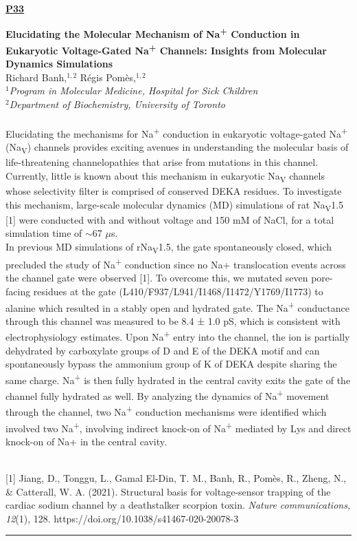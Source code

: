 \documentclass[titlepage,oneside,openany,10pt]{book}
\newenvironment{posterabswref}[5] %
        {
        \newcommand{\posterref}{#5}
	\begin{flushright}
                \underline{\textbf{#4}}
        \end{flushright}
        \textbf{#1}\\%
        #2\\%
        \textit{#3}\\\\%
        }
        {
        \vspace{0.5cm}
        \\\noindent \posterref \\ \noindent\rule{15cm}{0.5pt}%
        }
\begin{document}

\newpage

\begin{posterabswref}
    {Elucidating the Molecular Mechanism of Na\textsuperscript{+} Conduction in Eukaryotic Voltage-Gated Na\textsuperscript{+} Channels: Insights from Molecular Dynamics Simulations}
    {Richard Banh,$^{1,2}$ R\'{e}gis Pom\`{e}s,$^{1,2}$}
    {
    $^1$Program in Molecular Medicine, Hospital for Sick Children\\
    $^2$Department of Biochemistry, University of Toronto
    }
    {P33}
    {
    {[1]} Jiang, D., Tonggu, L., Gamal El-Din, T. M., Banh, R., Pom\`{e}s, R., Zheng, N., \& Catterall, W. A. (2021). Structural basis for voltage-sensor trapping of the cardiac sodium channel by a deathstalker scorpion toxin. \emph{Nature communications, 12}(1), 128. https://doi.org/10.1038/s41467-020-20078-3
    }
    Elucidating the mechanisms for Na\textsuperscript{+} conduction in eukaryotic voltage-gated Na\textsuperscript{+} (Na\textsubscript{V}) channels provides exciting avenues in understanding the molecular basis of life-threatening channelopathies that arise from mutations in this channel. Currently, little is known about this mechanism in eukaryotic Na\textsubscript{V} channels whose selectivity filter is comprised of conserved DEKA residues. To investigate this mechanism, large-scale molecular dynamics (MD) simulations of rat Na\textsubscript{V}1.5 {[}1{]} were conducted with and without voltage and 150 mM of NaCl, for a total simulation time of $\sim$67 $\mu$s.\\In previous MD simulations of rNa\textsubscript{V}1.5, the gate spontaneously closed, which precluded the study of Na\textsuperscript{+} conduction since no Na+ translocation events across the channel gate were observed {[}1{]}. To overcome this, we mutated seven pore-facing residues at the gate (L410/F937/L941/I1468/I1472/Y1769/I1773) to alanine which resulted in a stably open and hydrated gate. The Na\textsuperscript{+} conductance through this channel was measured to be 8.4 ± 1.0 pS, which is consistent with electrophysiology estimates. Upon Na\textsuperscript{+} entry into the channel, the ion is partially dehydrated by carboxylate groups of D and E of the DEKA motif and can spontaneously bypass the ammonium group of K of DEKA despite sharing the same charge. Na\textsuperscript{+} is then fully hydrated in the central cavity exits the gate of the channel fully hydrated as well. By analyzing the dynamics of Na\textsuperscript{+} movement through the channel, two Na\textsuperscript{+} conduction mechanisms were identified which involved two Na\textsuperscript{+}, involving indirect knock-on of Na\textsuperscript{+} mediated by Lys and direct knock-on of Na+ in the central cavity.
    \label{BanhR}
\end{posterabswref}
\end{document}
